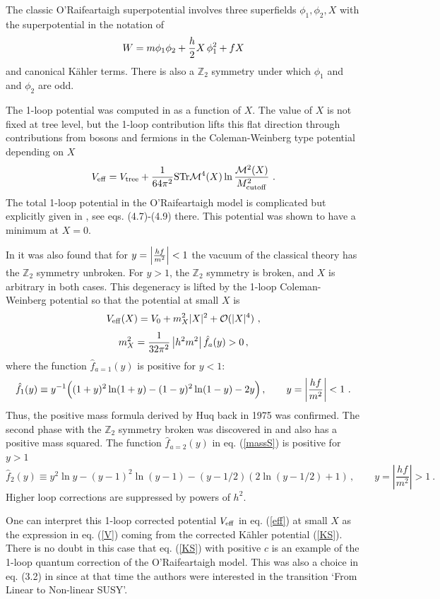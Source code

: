 \documentclass[11pt]{article}
\newcommand{\be}{\begin{equation}}
\newcommand{\ee}{\end{equation}}
\def\K{K{\"a}hler }
\newcommand{\rf}[1]{(\ref{#1})}
\def\be{\begin{equation}}
\def\ee{\end{equation}}
\begin{document}
The classic O'Raifeartaigh superpotential \cite{ORaifeartaigh:1975nky} involves three superfields $\phi_1, \phi_2, X$ with the superpotential in the notation of \cite{Intriligator:2007py}
\begin{eqnarray}
W = m \phi_1 \phi_2 + {h\over 2} X \, \phi_1^2 + f X 
\end{eqnarray}
and canonical K\"{a}hler terms.  There is also a $\mathbb{Z}_2$ symmetry under which $\phi_1$ and  and $\phi_2$ are odd. 

The 1-loop  potential  was computed in \cite{Huq:1975ue} as a function of $X$. The value of $X$ is not fixed at tree level, but the 1-loop contribution lifts this flat direction through contributions from bosons and fermions in the Coleman-Weinberg \cite{Coleman:1973jx} type potential depending on $X$
\be
V_{\rm eff} = V_{\rm tree} + {1\over 64 \pi^2} {\rm STr}  {\cal M}^4( X) \ln {{\cal M}^2( X)\over M^2_{\rm cutoff}} \ .
\label{CW}\ee
The total 1-loop potential in the O'Raifeartaigh model is complicated but explicitly given in  \cite{Huq:1975ue}, see eqs. (4.7)-(4.9) there. This potential  was shown to have a minimum at $X=0$.

In \cite{Intriligator:2007py} it was also found that for $y=\Big |{hf\over m^2} \Big |<1$ the vacuum of the classical theory has the $\mathbb{Z}_2$ symmetry unbroken. For $y>1$, the $\mathbb{Z}_2$ symmetry is broken, and $X$ is arbitrary in both cases. 
 This degeneracy is lifted by the 1-loop Coleman-Weinberg potential so that the potential at small $X$ is
 \be
V_{\rm eff}(X) = V_0 + m_X^2 |X|^2 + {\cal O} (|X|^4) \ ,
\label{eff} \ee
\be
m_X^2= {1\over 32 \pi^2} \left|h^2 m^2\right| \hat f_a(y) >0 \, , 
\label{massS}\ee
where the function $ \hat f_{a=1}(y)$ is positive for $y<1$:
\be
 \hat f_1(y)\equiv y^{-1} \Big((1+y)^2 \ln(1+y) - (1-y)^2 \ln (1-y) -2y\Big) \, , \qquad    y= \left|{hf\over m^2} \right|<1 \ .
\ee
Thus, the positive mass formula derived by Huq \cite{Huq:1975ue} back in 1975 was confirmed. The second phase with the $\mathbb{Z}_2$ symmetry broken was discovered in \cite{Intriligator:2007py} and also has a positive mass squared. The function $ \hat f_{a=2}(y)$ in eq. \rf{massS} is positive for $y>1$
\be
 \hat f_2(y)\equiv y^{2} \ln y - (y-1)^2 \ln (y-1)- (y-1/2) (2\ln (y-1/2) +1)  \, , \qquad y= \left|\frac{hf}{m^2} \right|>1 \ .
 \ee
Higher loop corrections are suppressed by powers of $h^2$.

One can interpret this 1-loop corrected potential $V_{\rm eff}$ in eq. \rf{eff} at small $X$ as the expression in eq. \rf{V} coming from the corrected \K potential \rf{KS}. There is no doubt in this case that eq. \rf{KS} with positive $c$ is an example of the 1-loop quantum correction of the O'Raifeartaigh model. This was also a choice in  eq. (3.2) in \cite{Cribiori:2017ngp} since at that time the authors were interested in the transition `From Linear to Non-linear SUSY'.
\end{document}
